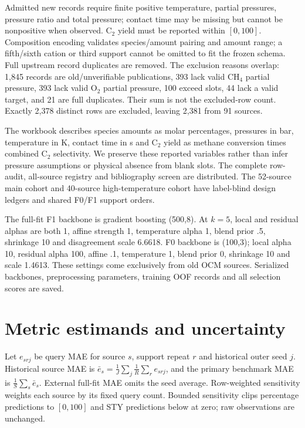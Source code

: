 \documentclass[11pt]{article}
\begin{document}
Admitted new records require finite positive temperature, partial pressures, pressure ratio and total pressure; contact time may be missing but cannot be nonpositive when observed. C$_2$ yield must be reported within $[0,100]$. Composition encoding validates species/amount pairing and amount range; a fifth/sixth cation or third support cannot be omitted to fit the frozen schema. Full upstream record duplicates are removed. The exclusion reasons overlap: 1,845 records are old/unverifiable publications, 393 lack valid CH$_4$ partial pressure, 393 lack valid O$_2$ partial pressure, 100 exceed slots, 44 lack a valid target, and 21 are full duplicates. Their sum is not the excluded-row count. Exactly 2,378 distinct rows are excluded, leaving 2,381 from 91 sources.

The workbook describes species amounts as molar percentages, pressures in bar, temperature in K, contact time in s and C$_2$ yield as methane conversion times combined C$_2$ selectivity. We preserve these reported variables rather than infer pressure assumptions or physical absence from blank slots. The complete row-audit, all-source registry and bibliography screen are distributed. The 52-source main cohort and 40-source high-temperature cohort have label-blind design ledgers and shared F0/F1 support orders.

The full-fit F1 backbone is gradient boosting (500,8). At $k=5$, local and residual alphas are both 1, affine strength 1, temperature alpha 1, blend prior .5, shrinkage 10 and disagreement scale 6.6618. F0 backbone is (100,3); local alpha 10, residual alpha 100, affine .1, temperature 1, blend prior 0, shrinkage 10 and scale 1.4613. These settings come exclusively from old OCM sources. Serialized backbones, preprocessing parameters, training OOF records and all selection scores are saved.


\section{Metric estimands and uncertainty}
Let $e_{srj}$ be query MAE for source $s$, support repeat $r$ and historical outer seed $j$. Historical source MAE is $\bar e_s=\frac1J\sum_j\frac1R\sum_r e_{srj}$, and the primary benchmark MAE is $\frac1S\sum_s\bar e_s$. External full-fit MAE omits the seed average. Row-weighted sensitivity weights each source by its fixed query count. Bounded sensitivity clips percentage predictions to $[0,100]$ and STY predictions below at zero; raw observations are unchanged.
\end{document}
